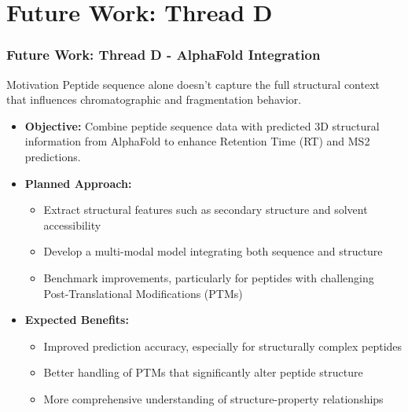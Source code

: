 \documentclass{beamer}
\begin{document}
\section{Future Work: Thread D}
\begin{frame}
  \frametitle{Future Work: Thread D - AlphaFold Integration}
  \begin{block}{Motivation}
    Peptide sequence alone doesn't capture the full structural context that influences chromatographic and fragmentation behavior.
  \end{block}
  \begin{itemize}
    \item \textbf{Objective:} Combine peptide sequence data with predicted 3D structural information from AlphaFold to enhance Retention Time (RT) and MS2 predictions.
    \item \textbf{Planned Approach:}
    \begin{itemize}
      \item Extract structural features such as secondary structure and solvent accessibility
      \item Develop a multi-modal model integrating both sequence and structure
      \item Benchmark improvements, particularly for peptides with challenging Post-Translational Modifications (PTMs)
    \end{itemize}
    \item \textbf{Expected Benefits:}
    \begin{itemize}
      \item Improved prediction accuracy, especially for structurally complex peptides
      \item Better handling of PTMs that significantly alter peptide structure
      \item More comprehensive understanding of structure-property relationships
    \end{itemize}
  \end{itemize}
\end{frame}
\end{document}
